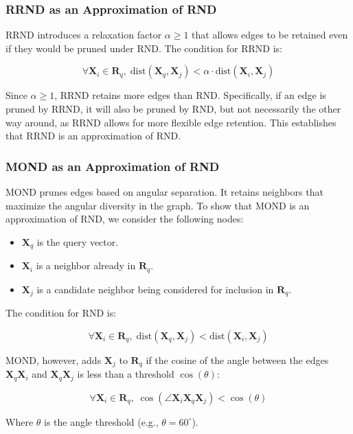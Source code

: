 \subsubsection{RRND as an Approximation of RND}

RRND introduces a relaxation factor \(\alpha \geq 1\) that allows edges to be retained even if they would be pruned under RND. The condition for RRND is:

\[
\forall \mathbf{X}_i \in \mathbf{R}_q, \; \text{dist}(\mathbf{X}_q, \mathbf{X}_j) < \alpha \cdot \text{dist}(\mathbf{X}_i, \mathbf{X}_j)
\]

Since \(\alpha \geq 1\), RRND retains more edges than RND. Specifically, if an edge is pruned by RRND, it will also be pruned by RND, but not necessarily the other way around, as RRND allows for more flexible edge retention. This establishes that RRND is an approximation of RND.

\subsubsection{MOND as an Approximation of RND}

MOND prunes edges based on angular separation. It retains neighbors that maximize the angular diversity in the graph. To show that MOND is an approximation of RND, we consider the following nodes:

\begin{itemize}
    \item \(\mathbf{X}_q\) is the query vector.
    \item \(\mathbf{X}_i\) is a neighbor already in \(\mathbf{R}_q\).
    \item \(\mathbf{X}_j\) is a candidate neighbor being considered for inclusion in \(\mathbf{R}_q\).
\end{itemize}

The condition for RND is:

\[
\forall \mathbf{X}_i \in \mathbf{R}_q, \; \text{dist}(\mathbf{X}_q, \mathbf{X}_j) < \text{dist}(\mathbf{X}_i, \mathbf{X}_j)
\]

MOND, however, adds \(\mathbf{X}_j\) to \(\mathbf{R}_q\) if the cosine of the angle between the edges \(\mathbf{X}_q \mathbf{X}_i\) and \(\mathbf{X}_q \mathbf{X}_j\) is less than a threshold \(\cos(\theta)\):

\[
\forall \mathbf{X}_i \in \mathbf{R}_q, \; \cos(\angle \mathbf{X}_i \mathbf{X}_q \mathbf{X}_j) < \cos(\theta)
\]

Where \(\theta\) is the angle threshold (e.g., \( \theta = 60^\circ \)).

